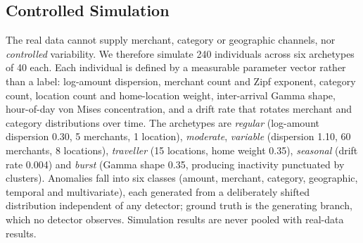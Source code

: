 \subsection{Controlled Simulation}
The real data cannot supply merchant, category or geographic channels, nor \emph{controlled} variability. We therefore simulate 240 individuals across six archetypes of 40 each. Each individual is defined by a measurable parameter vector rather than a label: log-amount dispersion, merchant count and Zipf exponent, category count, location count and home-location weight, inter-arrival Gamma shape, hour-of-day von Mises concentration, and a drift rate that rotates merchant and category distributions over time. The archetypes are \emph{regular} (log-amount dispersion 0.30, 5 merchants, 1 location), \emph{moderate}, \emph{variable} (dispersion 1.10, 60 merchants, 8 locations), \emph{traveller} (15 locations, home weight 0.35), \emph{seasonal} (drift rate 0.004) and \emph{burst} (Gamma shape 0.35, producing inactivity punctuated by clusters). Anomalies fall into six classes (amount, merchant, category, geographic, temporal and multivariate), each generated from a deliberately shifted distribution independent of any detector; ground truth is the generating branch, which no detector observes. Simulation results are never pooled with real-data results.
